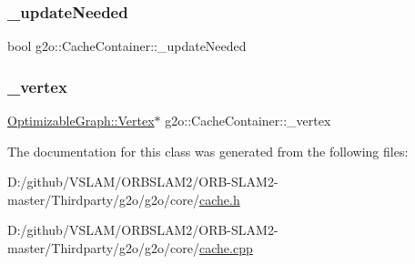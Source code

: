 \subsubsection{\texorpdfstring{\+\_\+update\+Needed}{\_updateNeeded}}
{\footnotesize\ttfamily bool g2o\+::\+Cache\+Container\+::\+\_\+update\+Needed\hspace{0.3cm}{\ttfamily [protected]}}

\mbox{\label{classg2o_1_1_cache_container_a899b5f4d01859463cedf663b68f78391}} 
\subsubsection{\texorpdfstring{\+\_\+vertex}{\_vertex}}
{\footnotesize\ttfamily \mbox{\hyperlink{classg2o_1_1_optimizable_graph_1_1_vertex}{Optimizable\+Graph\+::\+Vertex}}$\ast$ g2o\+::\+Cache\+Container\+::\+\_\+vertex\hspace{0.3cm}{\ttfamily [protected]}}



The documentation for this class was generated from the following files\+:\begin{DoxyCompactItemize}
\item 
D\+:/github/\+V\+S\+L\+A\+M/\+O\+R\+B\+S\+L\+A\+M2/\+O\+R\+B-\/\+S\+L\+A\+M2-\/master/\+Thirdparty/g2o/g2o/core/\mbox{\hyperlink{cache_8h}{cache.\+h}}\item 
D\+:/github/\+V\+S\+L\+A\+M/\+O\+R\+B\+S\+L\+A\+M2/\+O\+R\+B-\/\+S\+L\+A\+M2-\/master/\+Thirdparty/g2o/g2o/core/\mbox{\hyperlink{cache_8cpp}{cache.\+cpp}}\end{DoxyCompactItemize}
